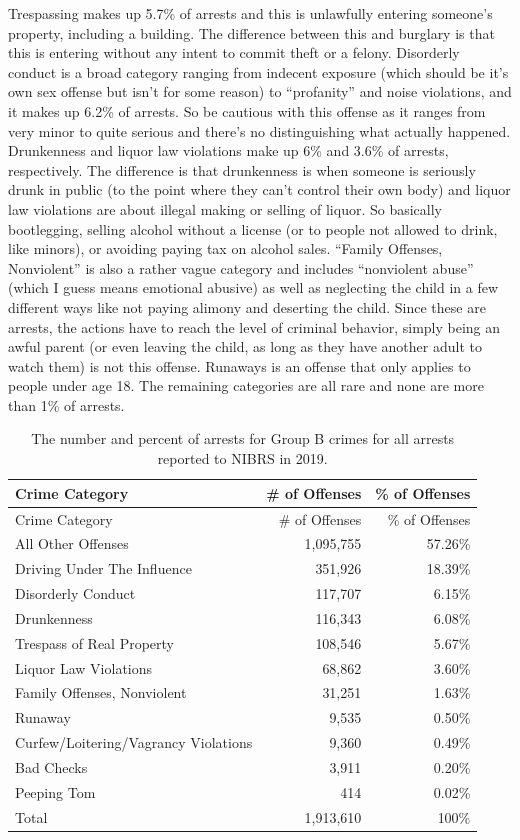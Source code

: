 \documentclass[
  12pt,
  openany]{book}
\begin{document}
Trespassing makes up 5.7\% of arrests and this is unlawfully entering someone's property, including a building. The difference between this and burglary is that this is entering without any intent to commit theft or a felony. Disorderly conduct is a broad category ranging from indecent exposure (which should be it's own sex offense but isn't for some reason) to ``profanity'' and noise violations, and it makes up 6.2\% of arrests. So be cautious with this offense as it ranges from very minor to quite serious and there's no distinguishing what actually happened. Drunkenness and liquor law violations make up 6\% and 3.6\% of arrests, respectively. The difference is that drunkenness is when someone is seriously drunk in public (to the point where they can't control their own body) and liquor law violations are about illegal making or selling of liquor. So basically bootlegging, selling alcohol without a license (or to people not allowed to drink, like minors), or avoiding paying tax on alcohol sales. ``Family Offenses, Nonviolent'' is also a rather vague category and includes ``nonviolent abuse'' (which I guess means emotional abusive) as well as neglecting the child in a few different ways like not paying alimony and deserting the child. Since these are arrests, the actions have to reach the level of criminal behavior, simply being an awful parent (or even leaving the child, as long as they have another adult to watch them) is not this offense. Runaways is an offense that only applies to people under age 18. The remaining categories are all rare and none are more than 1\% of arrests.

\begin{longtable}[]{@{}lrr@{}}
\caption{\label{tab:GroupBarresteeCrime}The number and percent of arrests for Group B crimes for all arrests reported to NIBRS in 2019.}\tabularnewline
\toprule
Crime Category & \# of Offenses & \% of Offenses\tabularnewline
\midrule
\endfirsthead
\toprule
Crime Category & \# of Offenses & \% of Offenses\tabularnewline
\midrule
\endhead
All Other Offenses & 1,095,755 & 57.26\%\tabularnewline
Driving Under The Influence & 351,926 & 18.39\%\tabularnewline
Disorderly Conduct & 117,707 & 6.15\%\tabularnewline
Drunkenness & 116,343 & 6.08\%\tabularnewline
Trespass of Real Property & 108,546 & 5.67\%\tabularnewline
Liquor Law Violations & 68,862 & 3.60\%\tabularnewline
Family Offenses, Nonviolent & 31,251 & 1.63\%\tabularnewline
Runaway & 9,535 & 0.50\%\tabularnewline
Curfew/Loitering/Vagrancy Violations & 9,360 & 0.49\%\tabularnewline
Bad Checks & 3,911 & 0.20\%\tabularnewline
Peeping Tom & 414 & 0.02\%\tabularnewline
Total & 1,913,610 & 100\%\tabularnewline
\bottomrule
\end{longtable}
\end{document}
